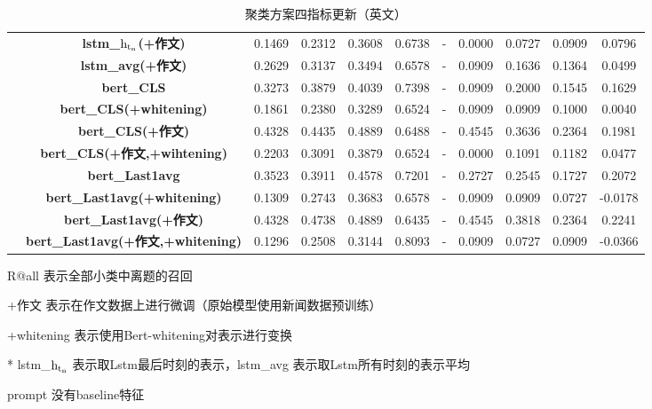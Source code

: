 \documentclass[11pt]{article}
\begin{document}
\begin{CJK}{UTF8}{gkai}
\begin{table}[htbp]
{\begin{tabular}{c|c|ccccccccc}
      & \textbf{lstm\_$\rm h_{t_n}$(+作文)} & 0.1469  & 0.2312  & 0.3608  & 0.6738  & -     & 0.0000  & 0.0727  & 0.0909  & 0.0796  \\
      & \textbf{lstm\_avg(+作文)} & 0.2629  & 0.3137  & 0.3494  & 0.6578  & -     & 0.0909  & 0.1636  & 0.1364  & 0.0499  \\
      \cline{2-11}
      & \textbf{bert\_CLS} & 0.3273  & 0.3879  & 0.4039  & 0.7398  & -     & 0.0909  & 0.2000  & 0.1545  & 0.1629  \\
      & \textbf{bert\_CLS(+whitening)} & 0.1861  & 0.2380  & 0.3289  & 0.6524  & -     & 0.0909  & 0.0909  & 0.1000  & 0.0040  \\
      & \textbf{bert\_CLS(+作文)} & 0.4328  & 0.4435  & 0.4889  & 0.6488  & -     & 0.4545  & 0.3636  & 0.2364  & 0.1981  \\
      & \textbf{bert\_CLS(+作文,+wihtening)} & 0.2203  & 0.3091  & 0.3879  & 0.6524  & -     & 0.0000  & 0.1091  & 0.1182  & 0.0477  \\
      \cline{2-11}
      & \textbf{bert\_Last1avg} & 0.3523  & 0.3911  & 0.4578  & 0.7201  & -     & 0.2727  & 0.2545  & 0.1727  & 0.2072  \\
      & \textbf{bert\_Last1avg(+whitening)} & 0.1309  & 0.2743  & 0.3683  & 0.6578  & -     & 0.0909  & 0.0909  & 0.0727  & -0.0178  \\
      & \textbf{bert\_Last1avg(+作文)} & 0.4328  & 0.4738  & 0.4889  & 0.6435  & -     & 0.4545  & 0.3818  & 0.2364  & 0.2241  \\
      & \textbf{bert\_Last1avg(+作文,+whitening)} & 0.1296  & 0.2508  & 0.3144  & 0.8093  & -     & 0.0909  & 0.0727  & 0.0909  & -0.0366  \\
      \hline
    \end{tabular}%
  }
    \begin{tablenotes}    %
      \footnotesize               %
      \item[1] R@all 表示全部小类中离题的召回
      \item[2] +作文 表示在作文数据上进行微调（原始模型使用新闻数据预训练） 
      \item[3] +whitening 表示使用Bert-whitening对表示进行变换
      \item[4] * lstm\_$\rm h_{t_n}$ 表示取Lstm最后时刻的表示，lstm\_avg 表示取Lstm所有时刻的表示平均
      \item[5] prompt 没有baseline特征 
    \end{tablenotes} 
    \caption{聚类方案四指标更新（英文）}
  \label{tab:addlabel}%
\end{table}%


\end{CJK}
\end{document}
